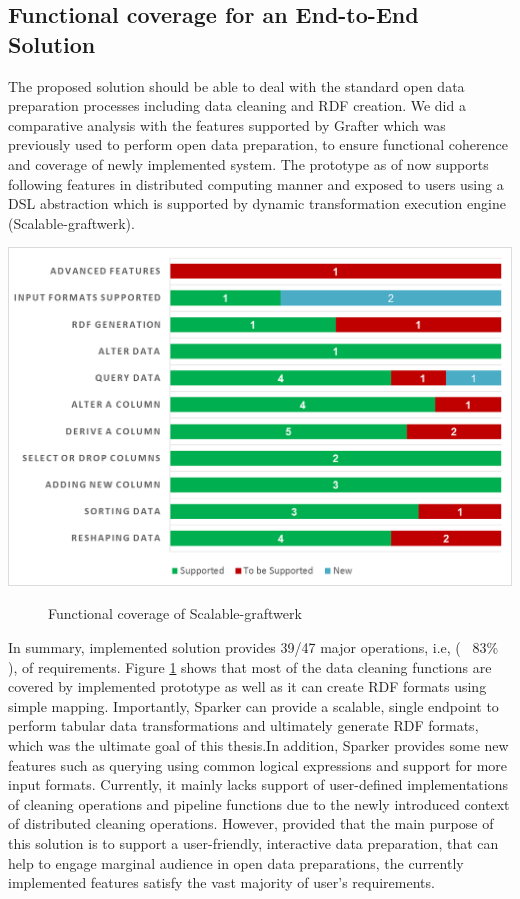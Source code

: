 \subsection{Functional coverage for an End-to-End Solution}
The proposed solution should be able to deal with the standard open data preparation processes including data cleaning and RDF creation. We did a comparative analysis with the features supported by Grafter which was previously used to perform open data preparation, to ensure functional coherence and coverage of newly implemented system.  The prototype as of now supports following features in distributed computing manner and exposed to users using a DSL abstraction which is supported by dynamic transformation execution engine (Scalable-graftwerk). 
\begin{center}
	\includegraphics[width=38em]{./Figures/functional-coverage-new}
	\begin{figure}[htbp]
    \caption{Functional coverage of Scalable-graftwerk}
    \label{fig:func-coverage}
	\end{figure}
\end{center}
In summary, implemented solution provides 39/47 major operations, i.e, ( ~83\% ), of requirements. Figure \ref{fig:func-coverage} shows that most of the data cleaning functions are covered by implemented prototype as well as it can create RDF formats using simple mapping. Importantly, Sparker can provide a scalable, single endpoint to perform tabular data transformations and ultimately generate RDF formats, which was the ultimate goal of this thesis.In addition, Sparker provides some new features such as querying using common logical expressions and support for more input formats.   Currently, it mainly lacks support of user-defined implementations of cleaning operations and pipeline functions due to the newly introduced context of distributed cleaning operations. However, provided that the main purpose of this solution is to support a user-friendly, interactive data preparation, that can help to engage marginal audience in open data preparations, the currently implemented features satisfy the vast majority of user's requirements. 
